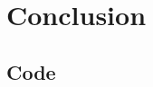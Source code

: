 \documentclass{sfuthesis}
\begin{document}
\chapter{Conclusion}



%
%
%
%
%

\backmatter%
	
	

\begin{appendices} %
	\chapter{Code}
\end{appendices}
\end{document}

